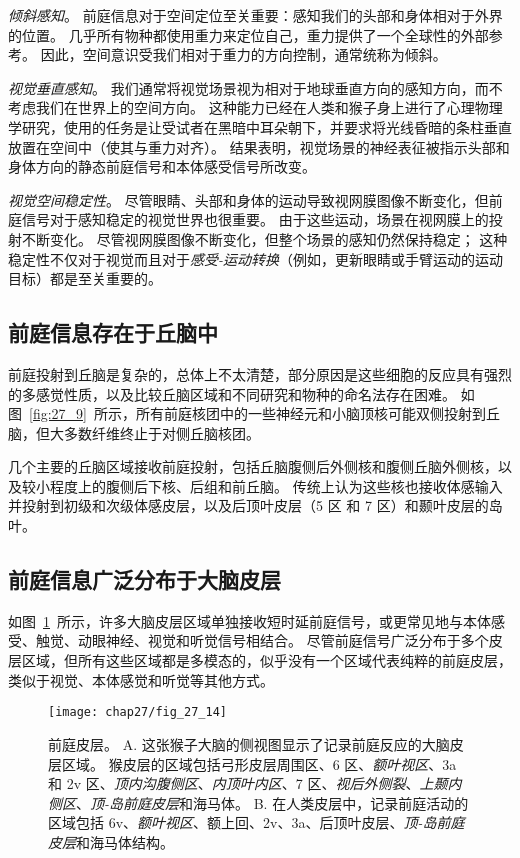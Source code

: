 \textit{倾斜感知}。
前庭信息对于空间定位至关重要：感知我们的头部和身体相对于外界的位置。
几乎所有物种都使用重力来定位自己，重力提供了一个全球性的外部参考。
因此，空间意识受我们相对于重力的方向控制，通常统称为倾斜。


\textit{视觉垂直感知}。
我们通常将视觉场景视为相对于地球垂直方向的感知方向，而不考虑我们在世界上的空间方向。
这种能力已经在人类和猴子身上进行了心理物理学研究，使用的任务是让受试者在黑暗中耳朵朝下，并要求将光线昏暗的条柱垂直放置在空间中（使其与重力对齐）。
结果表明，视觉场景的神经表征被指示头部和身体方向的静态前庭信号和本体感受信号所改变。


\textit{视觉空间稳定性}。
尽管眼睛、头部和身体的运动导致视网膜图像不断变化，但前庭信号对于感知稳定的视觉世界也很重要。
由于这些运动，场景在视网膜上的投射不断变化。
尽管视网膜图像不断变化，但整个场景的感知仍然保持稳定；
这种稳定性不仅对于视觉而且对于\textit{感受-运动转换}（例如，更新眼睛或手臂运动的运动目标）都是至关重要的。



\subsection{前庭信息存在于丘脑中}

前庭投射到丘脑是复杂的，总体上不太清楚，部分原因是这些细胞的反应具有强烈的多感觉性质，以及比较丘脑区域和不同研究和物种的命名法存在困难。
如图~\ref{fig:27_9}~所示，所有前庭核团中的一些神经元和小脑顶核可能双侧投射到丘脑，但大多数纤维终止于对侧丘脑核团。


几个主要的丘脑区域接收前庭投射，包括丘脑腹侧后外侧核和腹侧丘脑外侧核，以及较小程度上的腹侧后下核、后组和前丘脑。
传统上认为这些核也接收体感输入并投射到初级和次级体感皮层，以及后顶叶皮层（5 区 和 7 区）和颞叶皮层的岛叶。



\subsection{前庭信息广泛分布于大脑皮层}

如图~\ref{fig:27_14}~所示，许多大脑皮层区域单独接收短时延前庭信号，或更常见地与本体感受、触觉、动眼神经、视觉和听觉信号相结合。 
尽管前庭信号广泛分布于多个皮层区域，但所有这些区域都是多模态的，似乎没有一个区域代表纯粹的前庭皮层，类似于视觉、本体感觉和听觉等其他方式。


\begin{figure}[htbp]
	\centering
	\texttt{[image: chap27/fig\_27\_14]}
	\caption{前庭皮层。
		A. 这张猴子大脑的侧视图显示了记录前庭反应的大脑皮层区域。
		猴皮层的区域包括弓形皮层周围区、6 区、\textit{额叶视区}、3a 和 2v 区、\textit{顶内沟腹侧区}、\textit{内顶叶内区}、7 区、\textit{视后外侧裂}、\textit{上颞内侧区}、\textit{顶-岛前庭皮层}和海马体。
		B. 在人类皮层中，记录前庭活动的区域包括 6v、\textit{额叶视区}、额上回、2v、3a、后顶叶皮层、\textit{顶-岛前庭皮层}和海马体结构。}
	\label{fig:27_14}
\end{figure}


